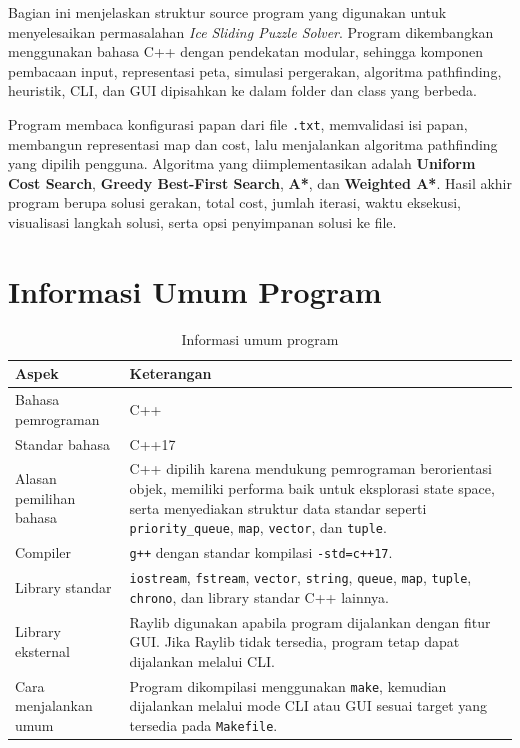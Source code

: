 Bagian ini menjelaskan struktur source program yang digunakan untuk menyelesaikan permasalahan \textit{Ice Sliding Puzzle Solver}. 
Program dikembangkan menggunakan bahasa C++ dengan pendekatan modular, sehingga komponen pembacaan input, representasi peta, simulasi pergerakan, algoritma pathfinding, heuristik, CLI, dan GUI dipisahkan ke dalam folder dan class yang berbeda.

\begin{tcolorbox}[
	colback=blue!5,
	colframe=blue!60!black,
	title=\textbf{Ringkasan Implementasi Program},
	arc=2mm,
	boxrule=0.8pt
]
Program membaca konfigurasi papan dari file \texttt{.txt}, memvalidasi isi papan, membangun representasi map dan cost, lalu menjalankan algoritma pathfinding yang dipilih pengguna. 
Algoritma yang diimplementasikan adalah \textbf{Uniform Cost Search}, \textbf{Greedy Best-First Search}, \textbf{A*}, dan \textbf{Weighted A*}. 
Hasil akhir program berupa solusi gerakan, total cost, jumlah iterasi, waktu eksekusi, visualisasi langkah solusi, serta opsi penyimpanan solusi ke file.
\end{tcolorbox}

\section{Informasi Umum Program}

\begin{table}[H]
	\centering
	\caption{Informasi umum program}
	\begin{tabular}{|p{4cm}|p{10cm}|}
		\hline
		\rowcolor{blue!15}
		\textbf{Aspek} & \textbf{Keterangan} \\
		\hline
		Bahasa pemrograman & C++ \\
		\hline
		Standar bahasa & C++17 \\
		\hline
		Alasan pemilihan bahasa & C++ dipilih karena mendukung pemrograman berorientasi objek, memiliki performa baik untuk eksplorasi state space, serta menyediakan struktur data standar seperti \texttt{priority\_queue}, \texttt{map}, \texttt{vector}, dan \texttt{tuple}. \\
		\hline
		Compiler & \texttt{g++} dengan standar kompilasi \texttt{-std=c++17}. \\
		\hline
		Library standar & \texttt{iostream}, \texttt{fstream}, \texttt{vector}, \texttt{string}, \texttt{queue}, \texttt{map}, \texttt{tuple}, \texttt{chrono}, dan library standar C++ lainnya. \\
		\hline
		Library eksternal & Raylib digunakan apabila program dijalankan dengan fitur GUI. Jika Raylib tidak tersedia, program tetap dapat dijalankan melalui CLI. \\
		\hline
		Cara menjalankan umum & Program dikompilasi menggunakan \texttt{make}, kemudian dijalankan melalui mode CLI atau GUI sesuai target yang tersedia pada \texttt{Makefile}. \\
		\hline
	\end{tabular}
\end{table}

